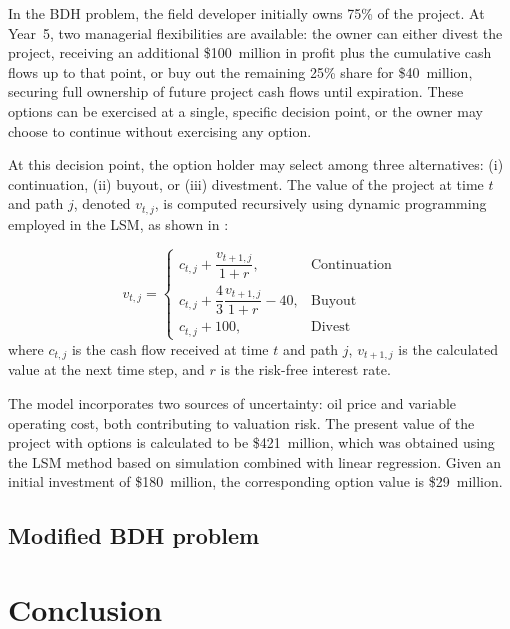 \documentclass[pdflatex,sn-basic]{sn-jnl}%
\theoremstyle{thmstyleone}%
\theoremstyle{thmstyletwo}%
\theoremstyle{thmstylethree}%
\begin{document}
In the BDH problem, the field developer initially owns 75\% of the project. At Year~5, two managerial flexibilities are available: the owner can either divest the project, receiving an additional \$100~million in profit plus the cumulative cash flows up to that point, or buy out the remaining 25\% share for \$40~million, securing full ownership of future project cash flows until expiration. These options can be exercised at a single, specific decision point, or the owner may choose to continue without exercising any option.

At this decision point, the option holder may select among three alternatives: (i) continuation, (ii) buyout, or (iii) divestment. The value of the project at time $t$ and path $j$, denoted $v_{t,j}$, is computed recursively using dynamic programming employed in the LSM, as shown in \citep{ref13, ref15}:

\begin{equation}
v_{t,j} = 
\begin{cases}
    c_{t,j} + \dfrac{v_{t+1,j}}{1+r}, & \text{Continuation} \\[2ex]
    c_{t,j} + \dfrac{4}{3} \dfrac{v_{t+1,j}}{1+r} - 40, & \text{Buyout} \\[2ex]
    c_{t,j} + 100, & \text{Divest}
\end{cases}
\label{eq:bdh_options}
\end{equation}
where $c_{t,j}$ is the cash flow received at time $t$ and path $j$, $v_{t+1,j}$ is the calculated value at the next time step, and $r$ is the risk-free interest rate.

The model incorporates two sources of uncertainty: oil price and variable operating cost, both contributing to valuation risk. The present value of the project with options is calculated to be \$421~million, which was obtained using the LSM method based on simulation combined with linear regression. Given an initial investment of \$180~million, the corresponding option value is \$29~million.



\subsection{Modified BDH problem}\label{subsec52}

\section{Conclusion}\label{sec6}
\end{document}
